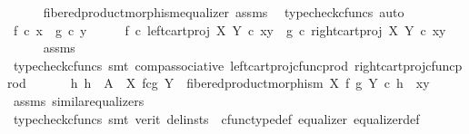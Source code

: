 \begin{isabellebody}
\ \ \ \ \isamarkupfalse%
\ fibered{\isacharunderscore}{\kern0pt}product{\isacharunderscore}{\kern0pt}morphism{\isacharunderscore}{\kern0pt}equalizer\ assms\ \isamarkupfalse%
\ {\isacharparenleft}{\kern0pt}typecheck{\isacharunderscore}{\kern0pt}cfuncs{\isacharcomma}{\kern0pt}\ auto{\isacharparenright}{\kern0pt}\isanewline
\isanewline
\ \ \isamarkupfalse%
\ {\isachardoublequoteopen}f\ {\isasymcirc}\isactrlsub c\ x\ {\isacharequal}{\kern0pt}\ g\ {\isasymcirc}\isactrlsub c\ y{\isachardoublequoteclose}\isanewline
\ \ \isamarkupfalse%
\ \isamarkupfalse%
\ {\isachardoublequoteopen}{\isacharparenleft}{\kern0pt}f\ {\isasymcirc}\isactrlsub c\ left{\isacharunderscore}{\kern0pt}cart{\isacharunderscore}{\kern0pt}proj\ X\ Y{\isacharparenright}{\kern0pt}\ {\isasymcirc}\isactrlsub c\ {\isasymlangle}x{\isacharcomma}{\kern0pt}y{\isasymrangle}\ {\isacharequal}{\kern0pt}\ {\isacharparenleft}{\kern0pt}g\ {\isasymcirc}\isactrlsub c\ right{\isacharunderscore}{\kern0pt}cart{\isacharunderscore}{\kern0pt}proj\ X\ Y{\isacharparenright}{\kern0pt}\ {\isasymcirc}\isactrlsub c\ {\isasymlangle}x{\isacharcomma}{\kern0pt}y{\isasymrangle}{\isachardoublequoteclose}\isanewline
\ \ \ \ \isamarkupfalse%
\ assms\ \isamarkupfalse%
\ {\isacharparenleft}{\kern0pt}typecheck{\isacharunderscore}{\kern0pt}cfuncs{\isacharcomma}{\kern0pt}\ smt\ comp{\isacharunderscore}{\kern0pt}associative{}\ left{\isacharunderscore}{\kern0pt}cart{\isacharunderscore}{\kern0pt}proj{\isacharunderscore}{\kern0pt}cfunc{\isacharunderscore}{\kern0pt}prod\ right{\isacharunderscore}{\kern0pt}cart{\isacharunderscore}{\kern0pt}proj{\isacharunderscore}{\kern0pt}cfunc{\isacharunderscore}{\kern0pt}prod{\isacharparenright}{\kern0pt}\isanewline
\ \ \isamarkupfalse%
\ \isamarkupfalse%
\ {\isachardoublequoteopen}{\isasymexists}{\isacharbang}{\kern0pt}\ h{\isachardot}{\kern0pt}\ h\ {\isacharcolon}{\kern0pt}\ A\ {\isasymrightarrow}\ X\ \isactrlbsub f\isactrlesub {\isasymtimes}\isactrlsub c\isactrlbsub g\isactrlesub \ Y\ {\isasymand}\ fibered{\isacharunderscore}{\kern0pt}product{\isacharunderscore}{\kern0pt}morphism\ X\ f\ g\ Y\ {\isasymcirc}\isactrlsub c\ h\ {\isacharequal}{\kern0pt}\ {\isasymlangle}x{\isacharcomma}{\kern0pt}y{\isasymrangle}{\isachardoublequoteclose}\isanewline
\ \ \ \ \isamarkupfalse%
\ assms\ similar{\isacharunderscore}{\kern0pt}equalizers\ \isamarkupfalse%
\ {\isacharparenleft}{\kern0pt}typecheck{\isacharunderscore}{\kern0pt}cfuncs{\isacharcomma}{\kern0pt}\ smt\ {\isacharparenleft}{\kern0pt}verit{\isacharcomma}{\kern0pt}\ del{\isacharunderscore}{\kern0pt}insts{\isacharparenright}{\kern0pt}\ \ cfunc{\isacharunderscore}{\kern0pt}type{\isacharunderscore}{\kern0pt}def\ equalizer\ equalizer{\isacharunderscore}{\kern0pt}def{\isacharparenright}{\kern0pt}\isanewline

\end{isabellebody}
